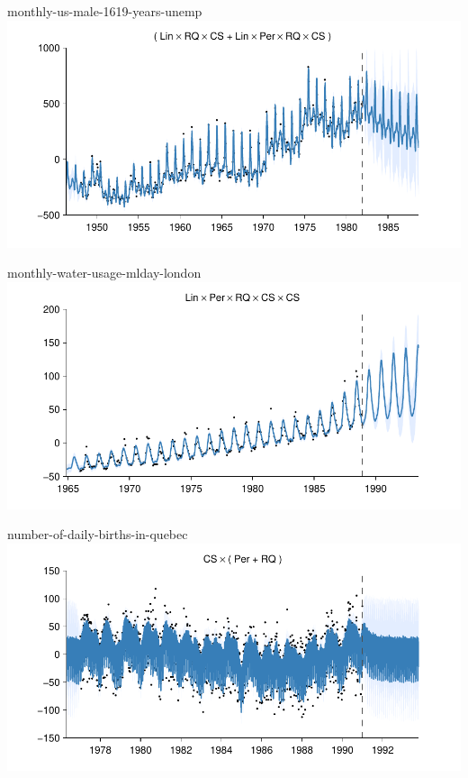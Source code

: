     
\begin{frame}{monthly-us-male-1619-years-unemp}
  \center
  \includegraphics[width=1.0\textwidth]{figures/monthly-us-male-1619-years-unemp/monthly-us-male-1619-years-unemp_all}
\end{frame}  


    
\begin{frame}{monthly-water-usage-mlday-london}
  \center
  \includegraphics[width=1.0\textwidth]{figures/monthly-water-usage-mlday-london/monthly-water-usage-mlday-london_all}
\end{frame}  


    
\begin{frame}{number-of-daily-births-in-quebec}
  \center
  \includegraphics[width=1.0\textwidth]{figures/number-of-daily-births-in-quebec/number-of-daily-births-in-quebec_all}
\end{frame}  


